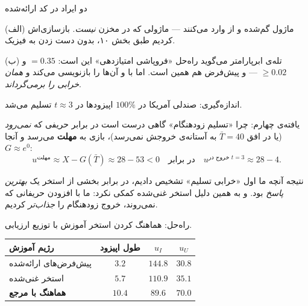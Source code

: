 \documentclass[12pt,aspectratio=169]{beamer}
\begin{document}
\begin{frame}{دو ایراد در کد ارائه‌شده}
\begin{block}{(الف) ماژول گم‌شده}
 و  از
 وارد می‌کنند — ماژولی که در مخزن \emph{نیست}.
بازسازی‌اش کردیم طبق  بخش ۱۰، بدون دست زدن به فیزیک.
\end{block}
\begin{alertblock}{(ب) تله‌ی ابرپارامتر}
 می‌گوید راه‌حل «فروپاشی امتیازدهی» این است:
$=0.35$ و $\ge0.02$ — و پیش‌فرض  هم
همین است. اما  با  و 
آن‌ها را بازنویسی می‌کند و \emph{همان خرابی را برمی‌گرداند}.
\medskip

اندازه‌گیری: صندلی آمریکا در $100\%$ اپیزودها در $t\approx3$ تسلیم می‌شد.
\end{alertblock}
\end{frame}

\begin{frame}{یافته‌ی چهارم: چرا «تسلیم زودهنگام» گاهی درست است}
در برابر حریفی که \emph{نمی‌رود} (یا در افق $\bar T=40$ به آستانه‌ی خروجش
نمی‌رسد)، بازی به \textbf{مهلت} می‌رسد و آنجا $G\approx e^0$:
\[
  u^{\text{مهلت}}\approx X-G(\bar T)\approx 28-53<0
  \quad\text{در برابر}\quad
  u^{\text{خروج در }t=3}\approx 28-4 .
\]
\begin{alertblock}{نتیجه}
آنچه ما اول «خرابی تسلیم» تشخیص دادیم، در برابر بخشی از استخر یک
\emph{بهترین پاسخ} بود. و به همین دلیل استخر غنی‌شده کمکی نکرد: ما با
افزودن حریفانی که نمی‌روند، خروج زودهنگام را \emph{جذاب‌تر} کردیم.
\end{alertblock}
راه‌حل: هماهنگ کردن استخر آموزش با توزیع ارزیابی.
\begin{table}\centering\small
\begin{tabular}{lccc}
\toprule
رژیم آموزش & طول اپیزود & $u_I$ & $u_U$\\
\midrule
پیش‌فرض‌های ارائه‌شده & $3.2$ & $144.8$ & $30.8$\\
استخر غنی‌شده & $5.7$ & $110.9$ & $35.1$\\
\textbf{هماهنگ با مرجع} & $\mathbf{10.4}$ & $\mathbf{89.6}$ & $\mathbf{70.0}$\\
\bottomrule
\end{tabular}
\end{table}
\end{frame}
\end{document}
